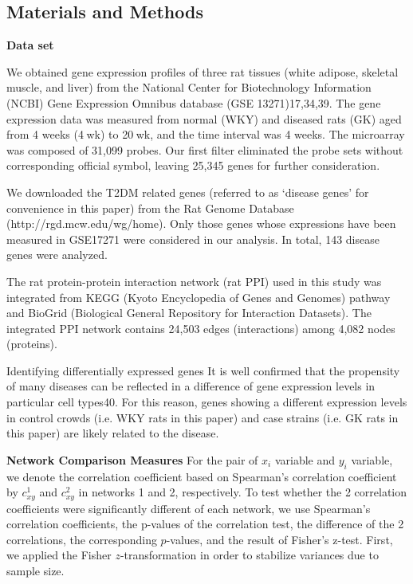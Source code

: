 \subsection{Materials and Methods}

\textbf{Data set}

We obtained gene expression profiles of three rat tissues (white adipose, skeletal muscle, and liver) from the National Center for Biotechnology Information (NCBI) Gene Expression Omnibus database (GSE 13271)17,34,39. The gene expression data was measured from normal (WKY) and diseased rats (GK) aged from 4 weeks (4 wk) to 20 wk, and the time interval was 4 weeks. The microarray was composed of 31,099 probes. Our first filter eliminated the probe sets without corresponding official symbol, leaving 25,345 genes for further consideration.

We downloaded the T2DM related genes (referred to as ‘disease genes’ for convenience in this paper) from the Rat Genome Database (http://rgd.mcw.edu/wg/home). Only those genes whose expressions have been measured in GSE17271 were considered in our analysis. In total, 143 disease genes were analyzed.

The rat protein-protein interaction network (rat PPI) used in this study was integrated from KEGG (Kyoto Encyclopedia of Genes and Genomes) pathway and BioGrid (Biological General Repository for Interaction Datasets). The integrated PPI network contains 24,503 edges (interactions) among 4,082 nodes (proteins).

Identifying differentially expressed genes
It is well confirmed that the propensity of many diseases can be reflected in a difference of gene expression levels in particular cell types40. For this reason, genes showing a different expression levels in control crowds (i.e. WKY rats in this paper) and case strains (i.e. GK rats in this paper) are likely related to the disease.



\textbf{Network Comparison Measures}
For the pair of $x_{i}$ variable and $y_{i}$ variable, we denote the correlation coefficient based on Spearman's correlation coefficient by $c_{xy}^1$ and $c_{xy}^2$ in networks 1 and 2, respectively. To test whether the 2 correlation coefficients were significantly different of each network, we use Spearman's correlation coefficients, the p-values of the correlation test, the difference of the 2 correlations, the corresponding $p$-values, and the result of Fisher's z-test. First, we applied the Fisher $z$-transformation in order to stabilize variances due to sample size.

